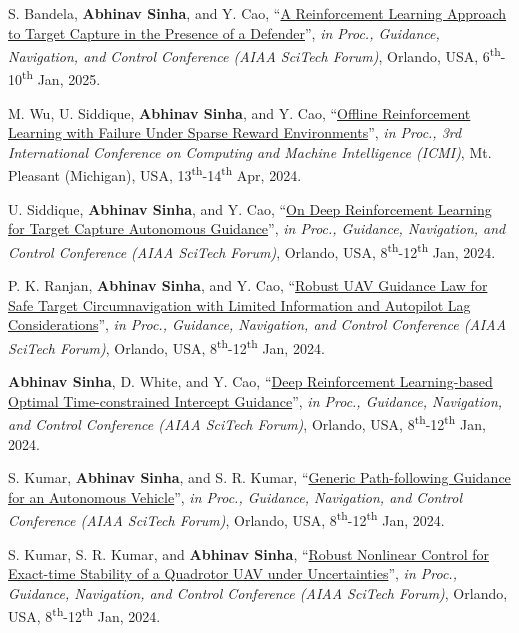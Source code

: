 {\begin{etaremune}[leftmargin=1cm]
		\item S. Bandela, \textbf{Abhinav Sinha}, and Y. Cao, ``\href{https://doi.org/10.2514/6.2025-1902}{A Reinforcement Learning Approach to Target Capture in the Presence of a Defender}'', \emph{in Proc., Guidance, Navigation, and Control Conference (AIAA SciTech Forum)}, Orlando, USA, 6\textsuperscript{th}-10\textsuperscript{th} Jan, 2025.
		\item M. Wu, U. Siddique, \textbf{Abhinav Sinha}, and Y. Cao, ``\href{https://ieeexplore.ieee.org/document/10585936}{Offline Reinforcement Learning with Failure Under Sparse Reward Environments}'', \emph{in Proc., 3rd International Conference on Computing and Machine Intelligence (ICMI)}, Mt. Pleasant (Michigan), USA, 13\textsuperscript{th}-14\textsuperscript{th} Apr, 2024.
		\item U. Siddique, \textbf{Abhinav Sinha}, and Y. Cao, ``\href{https://doi.org/10.2514/6.2024-0957}{On Deep Reinforcement Learning for Target Capture Autonomous Guidance}'', \emph{in Proc., Guidance, Navigation, and Control Conference (AIAA SciTech Forum)}, Orlando, USA, 8\textsuperscript{th}-12\textsuperscript{th} Jan, 2024.
		\item P. K. Ranjan, \textbf{Abhinav Sinha}, and Y. Cao, ``\href{https://arc.aiaa.org/doi/10.2514/6.2024-0124}{Robust UAV Guidance Law for Safe Target Circumnavigation with Limited Information and Autopilot Lag Considerations}'', \emph{in Proc., Guidance, Navigation, and Control Conference (AIAA SciTech Forum)}, Orlando, USA, 8\textsuperscript{th}-12\textsuperscript{th} Jan, 2024.
		\item \textbf{Abhinav Sinha}, D. White, and Y. Cao, ``\href{https://doi.org/10.2514/6.2024-0957}{Deep Reinforcement Learning-based Optimal Time-constrained Intercept Guidance}'', \emph{in Proc., Guidance, Navigation, and Control Conference (AIAA SciTech Forum)}, Orlando, USA, 8\textsuperscript{th}-12\textsuperscript{th} Jan, 2024.
		\item S. Kumar, \textbf{Abhinav Sinha}, and S. R. Kumar, ``\href{https://doi.org/10.2514/6.2024-1593}{Generic Path-following Guidance for an Autonomous Vehicle}'', \emph{in Proc., Guidance, Navigation, and Control Conference (AIAA SciTech Forum)}, Orlando, USA, 8\textsuperscript{th}-12\textsuperscript{th} Jan, 2024.
		\item S. Kumar, S. R. Kumar, and \textbf{Abhinav Sinha}, ``\href{https://doi.org/10.2514/6.2024-0319}{Robust Nonlinear Control for Exact-time Stability of a Quadrotor UAV under Uncertainties}'', \emph{in Proc., Guidance, Navigation, and Control Conference (AIAA SciTech Forum)}, Orlando, USA, 8\textsuperscript{th}-12\textsuperscript{th} Jan, 2024.

\end{etaremune}}
